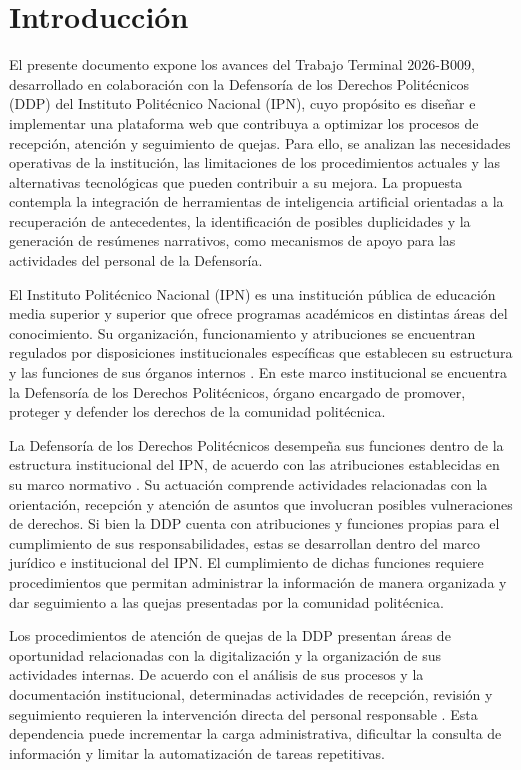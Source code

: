 \chapter{Introducción}

El presente documento expone los avances del Trabajo Terminal 2026-B009, desarrollado en colaboración con la Defensoría de los Derechos Politécnicos (DDP) del Instituto Politécnico Nacional (IPN), cuyo propósito es diseñar e implementar una plataforma web que contribuya a optimizar los procesos de recepción, atención y seguimiento de quejas. Para ello, se analizan las necesidades operativas de la institución, las limitaciones de los procedimientos actuales y las alternativas tecnológicas que pueden contribuir a su mejora. La propuesta contempla la integración de herramientas de inteligencia artificial orientadas a la recuperación de antecedentes, la identificación de posibles duplicidades y la generación de resúmenes narrativos, como mecanismos de apoyo para las actividades del personal de la Defensoría.

El Instituto Politécnico Nacional (IPN) es una institución pública de educación media superior y superior que ofrece programas académicos en distintas áreas del conocimiento. Su organización, funcionamiento y atribuciones se encuentran regulados por disposiciones institucionales específicas que establecen su estructura y las funciones de sus órganos internos \cite{ipn_ley_organica}. En este marco institucional se encuentra la Defensoría de los Derechos Politécnicos, órgano encargado de promover, proteger y defender los derechos de la comunidad politécnica.

La Defensoría de los Derechos Politécnicos desempeña sus funciones dentro de la estructura institucional del IPN, de acuerdo con las atribuciones establecidas en su marco normativo \cite{ipn_acuerdo622, ipn_manual_organizacion_ddp}. Su actuación comprende actividades relacionadas con la orientación, recepción y atención de asuntos que involucran posibles vulneraciones de derechos. Si bien la DDP cuenta con atribuciones y funciones propias para el cumplimiento de sus responsabilidades, estas se desarrollan dentro del marco jurídico e institucional del IPN. El cumplimiento de dichas funciones requiere procedimientos que permitan administrar la información de manera organizada y dar seguimiento a las quejas presentadas por la comunidad politécnica.

Los procedimientos de atención de quejas de la DDP presentan áreas de oportunidad relacionadas con la digitalización y la organización de sus actividades internas. De acuerdo con el análisis de sus procesos y la documentación institucional, determinadas actividades de recepción, revisión y seguimiento requieren la intervención directa del personal responsable \cite{ipn_manual_procedimientos_ddp}. Esta dependencia puede incrementar la carga administrativa, dificultar la consulta de información y limitar la automatización de tareas repetitivas.

